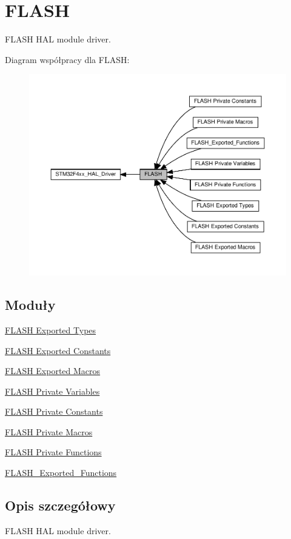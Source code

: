 \hypertarget{group___f_l_a_s_h}{}\section{F\+L\+A\+SH}
\label{group___f_l_a_s_h}


F\+L\+A\+SH H\+AL module driver.  


Diagram współpracy dla F\+L\+A\+SH\+:\nopagebreak
\begin{figure}[H]
\begin{center}
\leavevmode
\includegraphics[width=350pt]{group___f_l_a_s_h}
\end{center}
\end{figure}
\subsection*{Moduły}
\begin{DoxyCompactItemize}
\item 
\hyperlink{group___f_l_a_s_h___exported___types}{F\+L\+A\+S\+H Exported Types}
\item 
\hyperlink{group___f_l_a_s_h___exported___constants}{F\+L\+A\+S\+H Exported Constants}
\item 
\hyperlink{group___f_l_a_s_h___exported___macros}{F\+L\+A\+S\+H Exported Macros}
\item 
\hyperlink{group___f_l_a_s_h___private___variables}{F\+L\+A\+S\+H Private Variables}
\item 
\hyperlink{group___f_l_a_s_h___private___constants}{F\+L\+A\+S\+H Private Constants}
\item 
\hyperlink{group___f_l_a_s_h___private___macros}{F\+L\+A\+S\+H Private Macros}
\item 
\hyperlink{group___f_l_a_s_h___private___functions}{F\+L\+A\+S\+H Private Functions}
\item 
\hyperlink{group___f_l_a_s_h___exported___functions}{F\+L\+A\+S\+H\+\_\+\+Exported\+\_\+\+Functions}
\end{DoxyCompactItemize}


\subsection{Opis szczegółowy}
F\+L\+A\+SH H\+AL module driver. 

